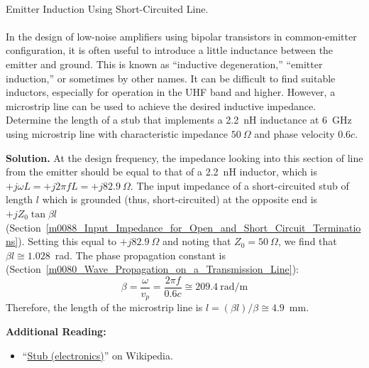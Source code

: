 ~\\ \begin{example} 
\begin{mdframed}[backgroundcolor=brown!20,linecolor=brown!20]\raggedright
Emitter Induction 
Using Short-Circuited Line. 
\\~\\
In the design of low-noise amplifiers using bipolar transistors in common-emitter configuration, it is often useful to introduce a little inductance between the emitter and ground.
This is known as ``inductive degeneration,'' ``emitter induction,'' or sometimes by other names.
It can be difficult to find suitable inductors, especially for operation in the UHF band and higher.
However, a microstrip 
line can be used to achieve the desired inductive impedance.
Determine the length of a stub that implements a 2.2~nH inductance at 6~GHz using microstrip line with characteristic impedance $50~\Omega$ and phase velocity $0.6c$. 

{\bf Solution.}
At the design frequency, the impedance looking into this section of line from the emitter should be equal to that of a 2.2~nH inductor, which is 
$+j\omega L = +j2\pi fL = +j82.9~\Omega$.
The input impedance of a short-circuited stub of length $l$ which is grounded (thus, short-circuited) at the opposite end is $+jZ_0\tan\beta l$ (Section~\ref{m0088_Input_Impedance_for_Open_and_Short_Circuit_Terminations}).  
Setting this equal to $+j82.9~\Omega$ and noting that $Z_0=50~\Omega$, we find that $\beta l \cong 1.028$~rad.
The phase propagation constant is (Section~\ref{m0080_Wave_Propagation_on_a_Transmission_Line}):
%
\begin{equation}
\beta = \frac{\omega}{v_p} = \frac{2\pi f}{0.6 c} \cong 209.4~\mbox{rad/m}
\end{equation}
%
Therefore, the length of the microstrip line is $l = \left(\beta l\right) / \beta \cong 4.9$~mm.

\end{mdframed}\end{example}


{\bf Additional Reading:}
\begin{itemize}
\item ``\href{https://en.wikipedia.org/wiki/Stub_(electronics)}{Stub (electronics)}'' on Wikipedia.
\end{itemize}






